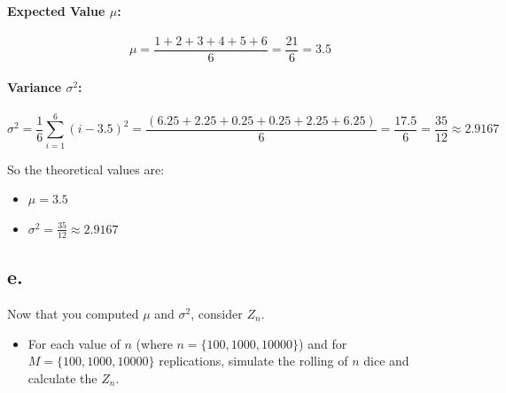 \documentclass[
]{article}
\providecommand{\tightlist}{%
  \setlength{\itemsep}{0pt}\setlength{\parskip}{0pt}}
\begin{document}
\paragraph{\texorpdfstring{Expected Value
\(\mu\):}{Expected Value \textbackslash mu:}}\label{expected-value-mu}

\[
\mu = \frac{1 + 2 + 3 + 4 + 5 + 6}{6} = \frac{21}{6} = 3.5
\]

\paragraph{\texorpdfstring{Variance
\(\sigma^2\):}{Variance \textbackslash sigma\^{}2:}}\label{variance-sigma2}

\[
\sigma^2 = \frac{1}{6} \sum_{i=1}^{6} (i - 3.5)^2 = \frac{(6.25 + 2.25 + 0.25 + 0.25 + 2.25 + 6.25)}{6} = \frac{17.5}{6} = \frac{35}{12} \approx 2.9167
\]

So the theoretical values are:

\begin{itemize}
\tightlist
\item
  \(\mu = 3.5\)
\item
  \(\sigma^2 = \frac{35}{12} \approx 2.9167\)
\end{itemize}

\subsection{e.}\label{e.-1}

Now that you computed \(\mu\) and \(\sigma^2\), consider \(Z_n\).

\begin{itemize}
\tightlist
\item
  For each value of \(n\) (where \(n=\{100,1000,10000\}\)) and for
  \(M=\{100,1000,10000\}\) replications, simulate the rolling of \(n\)
  dice and calculate the \(Z_n\).
\end{itemize}
\end{document}
